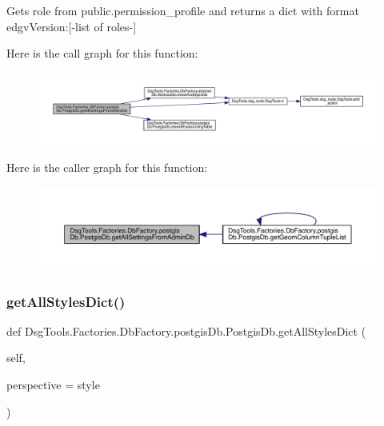 \begin{DoxyVerb}Gets role from public.permission_profile and returns a dict with format {edgvVersion:[-list of roles-]}
\end{DoxyVerb}
 Here is the call graph for this function\+:
\nopagebreak
\begin{figure}[H]
\begin{center}
\leavevmode
\includegraphics[width=350pt]{class_dsg_tools_1_1_factories_1_1_db_factory_1_1postgis_db_1_1_postgis_db_a87f17b0f87c84679d77ca6a197c78eaf_cgraph}
\end{center}
\end{figure}
Here is the caller graph for this function\+:
\nopagebreak
\begin{figure}[H]
\begin{center}
\leavevmode
\includegraphics[width=350pt]{class_dsg_tools_1_1_factories_1_1_db_factory_1_1postgis_db_1_1_postgis_db_a87f17b0f87c84679d77ca6a197c78eaf_icgraph}
\end{center}
\end{figure}
\mbox{\label{class_dsg_tools_1_1_factories_1_1_db_factory_1_1postgis_db_1_1_postgis_db_af255f96d50c2346b5d6dcef8f842e51d}} 
\subsubsection{\texorpdfstring{get\+All\+Styles\+Dict()}{getAllStylesDict()}}
{\footnotesize\ttfamily def Dsg\+Tools.\+Factories.\+Db\+Factory.\+postgis\+Db.\+Postgis\+Db.\+get\+All\+Styles\+Dict (\begin{DoxyParamCaption}\item[{}]{self,  }\item[{}]{perspective = {\ttfamily \textquotesingle{}style\textquotesingle{}} }\end{DoxyParamCaption})}

